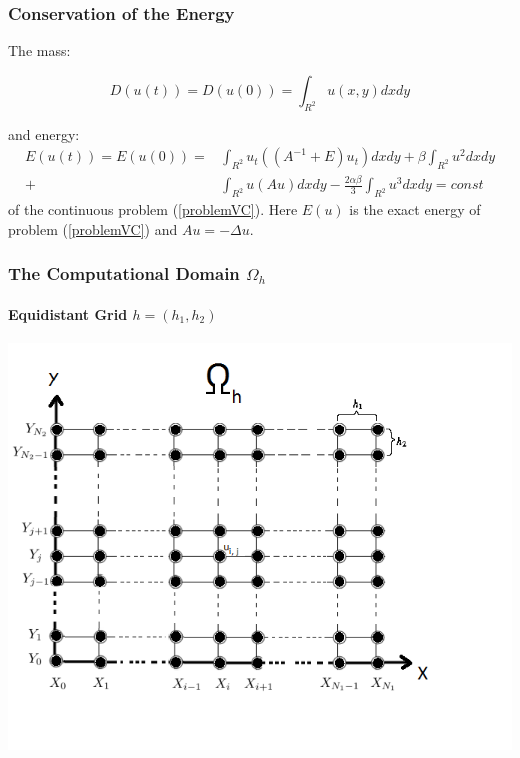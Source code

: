 \documentclass{beamer}
\newcommand{\rf}[1]{(\ref{#1})}
\begin{document}
\begin{frame}
\frametitle{Conservation of the Energy}
The mass:

\begin{equation}\label{int}
D(u(t))=D(u(0))=\int_{R^2} u(x,y)dx dy
\end{equation}

and energy:
\begin{align}\label{ex-en}
E(u(t)) = E(u(0)) =&\int_{R^2} u_t \left((A^{-1}+E)u_t\right) dxdy+
\beta \int_{R^2} u^2 dxdy \nonumber\\
+& \int_{R^2}u \left(A u\right) dxdy
-\frac{2 \alpha \beta}{3} \int_{R^2} u^3 dxdy =const
\end{align}
of the continuous problem \rf{problemVC}. Here $E(u)$ is the exact energy of problem \rf{problemVC} and $Au=-\Delta u$.
\end{frame}


\begin{frame}
\frametitle{The Computational Domain $\Omega_h$}
\framesubtitle{Equidistant Grid $h=(h_1, h_2)$}
\begin{center}\vspace{0.4cm}
	\begin{minipage}[b]{0.6\linewidth}
		\includegraphics[width=\linewidth]{Omega_dah.png}
	\end{minipage}
\end{center}

\end{frame}
\end{document}
